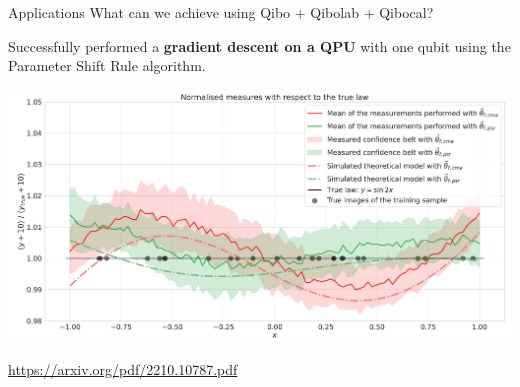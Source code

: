 \documentclass[11p,aspectratio=169]{beamer}
\begin{document}
\begin{frame}{Applications}
    What can we achieve using Qibo + Qibolab + Qibocal?

    Successfully performed a \textbf{gradient descent on a
    QPU} with one qubit using the Parameter Shift Rule algorithm.

    \includegraphics[width=\textwidth]{figures/normed_results.pdf}


    \url{https://arxiv.org/pdf/2210.10787.pdf}
\end{frame}
\end{document}
